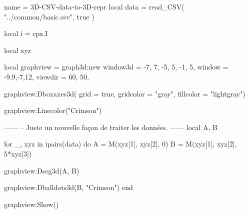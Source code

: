 \documentclass{standalone}
\begin{document}
\begin{luadraw}{name = 3D-CSV-data-to-3D-repr}
local data = read_CSV(
  "../common/basic.csv",
  true
)

local i = cpx.I

local xyz

local graphview = graph3d:new{
  window3d = {-7, 7, -5, 5, -1, 5},
  window   = {-9,9,-7,12},
  viewdir = {60, 50},
}

graphview:Dboxaxes3d({
  grid      = true,
  gridcolor = "gray",
  fillcolor = "lightgray"})

graphview:Linecolor("Crimson")

------
-- Juste un nouvelle façon de traiter les données.
------
local A, B

for _, xyz in ipairs(data) do
  A = M(xyz[1], xyz[2], 0)
  B = M(xyz[1], xyz[2], 5*xyz[3])

  graphview:Dseg3d({A, B})

  graphview:Dballdots3d({B}, "Crimson")
end

graphview:Show()
\end{luadraw}
\end{document}
